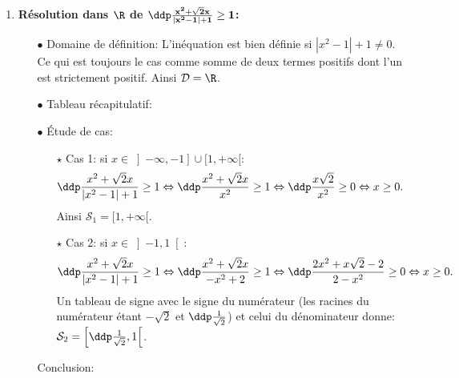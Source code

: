 \begin{correction}
\begin{enumerate}
\item \textbf{R\'esolution dans $\mathbf{\R}$ de $\mathbf{\ddp\frac{ x^2+\sqrt{2}x }{|x^2-1|+1}\geq 1}$:}\\
\begin{itemize}
\item[$\bullet$] Domaine de d\'efinition: L'in\'equation est bien d\'efinie si $|x^2-1|+1\not= 0$. Ce qui est toujours le cas comme somme de deux termes positifs dont l'un est strictement positif.
Ainsi $\mathcal{D}=\R$.
\item[$\bullet$] Tableau r\'ecapitulatif:
\begin{center}
\end{center}
\item[$\bullet$] \'Etude de cas:
\begin{itemize}
\item[$\star$] Cas 1: si $x\in\left\rbrack -\infty,-1\right\rbrack\cup\lbrack 1,+\infty\lbrack$: 
$$\ddp\frac{ x^2+\sqrt{2}x }{|x^2-1|+1}\geq 1 \Leftrightarrow \ddp\frac{ x^2+\sqrt{2}x }{x^2}\geq 1\Leftrightarrow \ddp\frac{x\sqrt{2}}{x^2}\geq 0\Leftrightarrow x\geq 0  .$$
Ainsi $\mathcal{S}_1=\lbrack 1,+\infty\lbrack$.
\item[$\star$] Cas 2: si $x\in\left\rbrack -1,1\right\lbrack$: 
$$\ddp\frac{ x^2+\sqrt{2}x }{|x^2-1|+1}\geq 1 \Leftrightarrow \ddp\frac{ x^2+\sqrt{2}x }{-x^2+2}\geq 1\Leftrightarrow \ddp\frac{2x^2+x\sqrt{2}-2}{2-x^2}\geq 0\Leftrightarrow x\geq 0  .$$
Un tableau de signe avec le signe du num\'erateur (les racines du num\'erateur \'etant $-\sqrt{2}$ et $\ddp\frac{1}{\sqrt{2}}$) et celui du d\'enominateur donne: $\mathcal{S}_2=\left\lbrack \ddp\frac{1}{\sqrt{2}},1\right\lbrack$.
\end{itemize}
Conclusion: 
\end{itemize}
\end{enumerate}
\end{correction}